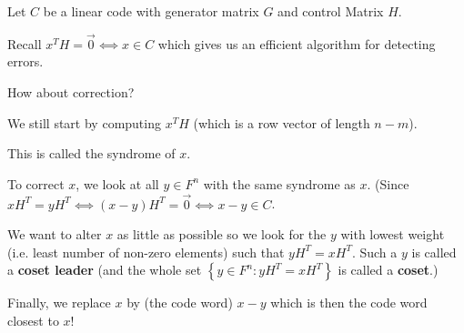 \documentclass[english]{lbscript}
\begin{document}
Let \(C\) be a linear code with generator matrix \(G\) and control Matrix \(H\).

Recall \(x^{T}H=\vec{0}⟺x∈C\) which gives us an efficient algorithm for detecting errors.

How about correction?

We still start by computing \(x^{T}H\) (which is a row vector of length \(n-m\)).

This is called the syndrome of \(x\).

To correct \(x\), we look at all \(y∈F^{n}\) with the same syndrome as \(x\). (Since \(xH^{T}=yH^{T}⟺(x-y)H^{T}=\vec{0}⟺x-y∈C\).

We want to alter \(x\) as little as possible so we look for the \(y\) with lowest weight (i.e. least number of non-zero elements) such that \(yH^{T}=xH^{T}\). Such a \(y\) is called a \textbf{coset leader} (and the whole set \(\left\{ y∈F^{n}: yH^{T}=xH^{T} \right\} \) is called a \textbf{coset}.)

Finally, we replace \(x\) by (the code word) \(x-y\) which is then the code word closest to \(x\)!
\end{document}
